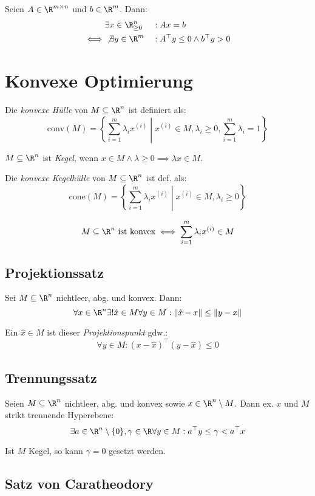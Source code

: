 Seien \(A \in \R^{m \times n}\) und \(b \in \R^m\). Dann:
\begin{align*}
&\exists x \in \R_{\geq 0}^n &&: Ax=b \\
\iff &\not\exists y \in \R^m &&: A^\top y \leq 0 \land b^\top y > 0
\end{align*}

\section*{Konvexe Optimierung}

Die \emph{konvexe Hülle} von \(M \subseteq \R^n\) ist definiert als:
\[\text{conv}(M) = \left\{ \sum_{i=1}^m \lambda_i x^{(i)} \middle| x^{(i)} \in M, \lambda_i \geq 0, \sum_{i=1}^m \lambda_i = 1 \right\}\]

\(M \subseteq \R^n\) ist \emph{Kegel}, wenn \(x \in M \land \lambda \geq 0 \implies \lambda x \in M\).

Die \emph{konvexe Kegelhülle} von \(M \subseteq \R^n\) ist def. als:
\[\text{cone}(M) = \left\{ \sum_{i=1}^m \lambda_i x^{(i)} \middle| x^{(i)} \in M, \lambda_i \geq 0 \right\}\]

\[M \subseteq \R^n \text{ ist konvex} \iff \sum_{i=1}^m \lambda_i x^{(i)} \in M\]

\subsection*{Projektionssatz}

Sei \(M \subseteq \R^n\) nichtleer, abg. und konvex. Dann: \[\forall x \in \R^n \exists! \hat x \in M \forall y \in M: \|\hat x - x\| \leq \|y - x\|\]

Ein \(\hat x \in M\) ist dieser \emph{Projektionspunkt} gdw.: \[\forall y \in M : (x-\hat x)^\top (y-\hat x) \leq 0\]

\subsection*{Trennungssatz}

Seien \(M \subseteq \R^n\) nichtleer, abg. und konvex sowie \(x \in \R^n \setminus M\). Dann ex. \(x\) und \(M\) strikt trennende Hyperebene: \[\exists a \in \R^n \setminus \{0\}, \gamma \in \R \forall y \in M : a^\top y \leq \gamma < a^\top x\]

Ist \(M\) Kegel, so kann \(\gamma = 0\) gesetzt werden.

\subsection*{Satz von Caratheodory}

